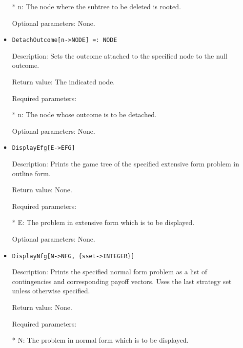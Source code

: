 \begin{itemize}
\bd
\item  
[* n:] The node where the subtree to be deleted is rooted.
\ed

\item
[Optional parameters:] None.
\ed

\item
\begin{verbatim}
DetachOutcome[n->NODE] =: NODE
\end{verbatim}

\bd
\item
[Description:] Sets the outcome attached to the specified node to the 
null outcome.
\item   
[Return value:] The indicated node.
\item
[Required parameters:]\hfil\null

\bd
\item	
[* n:] The node whose outcome is to be detached.
\ed

\item
[Optional parameters:] None.
\ed

\item
\begin{verbatim}
DisplayEfg[E->EFG]
\end{verbatim}

\bd
\item
[Description:] Prints the game tree of the specified extensive form
problem in outline form.
\item
[Return value:] None.
\item
[Required parameters:]\hfil\null

\bd
\item
[* E:] The problem in extensive form which is to be displayed.
\ed

\item
[Optional parameters:] None.
\ed

\item
\begin{verbatim}
DisplayNfg[N->NFG, {sset->INTEGER}]
\end{verbatim}

\bd
\item
[Description:] Prints the specified normal form problem as a list of
contingencies and corresponding payoff vectors.  Uses the last
strategy set unless otherwise specified.
\item
[Return value:] None.
\item
[Required parameters:]\hfil\null

\bd	
\item
[* N:] The problem in normal form which is to be displayed.
\ed


\end{itemize}
